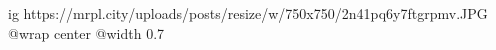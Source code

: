 
 
 
 
 

\ifcmt
  ig https://mrpl.city/uploads/posts/resize/w/750x750/2n41pq6y7ftgrpmv.JPG
  @wrap center
  @width 0.7
\fi
